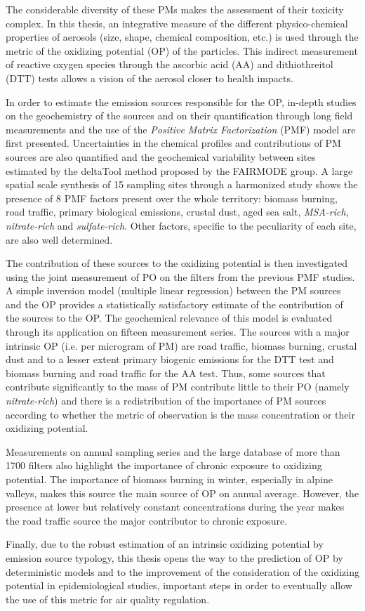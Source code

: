 The considerable diversity of these PMs makes the assessment of their toxicity complex.
In this thesis, an integrative measure of the different physico-chemical properties of
aerosols (size, shape, chemical composition, etc.) is used through the metric of the
oxidizing potential (OP) of the particles. This indirect measurement of reactive oxygen
species through the ascorbic acid (AA) and dithiothreitol (DTT) tests allows a vision of
the aerosol closer to health impacts.

In order to estimate the emission sources responsible for the OP, in-depth studies on the
geochemistry of the sources and on their quantification through long field measurements
and the use of the \textit{Positive Matrix Factorization} (PMF) model are first
presented.  Uncertainties in the chemical profiles and contributions of PM sources are
also quantified and the geochemical variability between sites estimated by the deltaTool
method proposed by the FAIRMODE group.  A large spatial scale synthesis of 15 sampling
sites through a harmonized study shows the presence of 8 PMF factors present over the
whole territory: biomass burning, road traffic, primary biological emissions,
crustal dust, aged sea salt, \textit{MSA-rich}, \textit{nitrate-rich} and
\textit{sulfate-rich}. Other factors, specific to the peculiarity of each site, are also
well determined.

The contribution of these sources to the oxidizing potential is then investigated using
the joint measurement of PO on the filters from the previous PMF studies. A simple
inversion model (multiple linear regression) between the PM sources and the OP provides a
statistically satisfactory estimate of the contribution of the sources to the OP. The
geochemical relevance of this model is evaluated through its application on fifteen
measurement series. The sources with a major intrinsic OP (i.e. per
microgram of PM) are road traffic, biomass burning, crustal dust and to a lesser
extent primary biogenic emissions for the DTT test and biomass burning and road
traffic for the AA test. Thus, some sources that contribute significantly to the mass of
PM contribute little to their PO (namely \textit{nitrate-rich}) and there is a
redistribution of the importance of PM sources according to whether the metric of
observation is the mass concentration or their oxidizing potential.

Measurements on annual sampling series and the large database of more than 1700 filters
also highlight the importance of chronic exposure to oxidizing potential. The importance
of biomass burning in winter, especially in alpine valleys, makes this source the main
source of OP on annual average. However, the presence at lower but relatively constant
concentrations during the year makes the road traffic source the major contributor to
chronic exposure.

Finally, due to the robust estimation of an intrinsic oxidizing
potential by emission source typology, this thesis opens the way
to the prediction of OP by deterministic models and to the 
improvement of the consideration of the oxidizing potential in 
epidemiological studies, important steps in order to eventually 
allow the use of this metric for air quality regulation.


